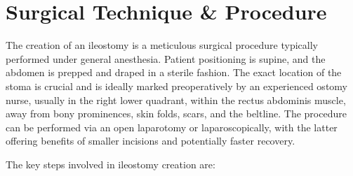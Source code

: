 \section*{Surgical Technique \& Procedure}
The creation of an ileostomy is a meticulous surgical procedure typically performed under general anesthesia. Patient positioning is supine, and the abdomen is prepped and draped in a sterile fashion. The exact location of the stoma is crucial and is ideally marked preoperatively by an experienced ostomy nurse, usually in the right lower quadrant, within the rectus abdominis muscle, away from bony prominences, skin folds, scars, and the beltline. The procedure can be performed via an open laparotomy or laparoscopically, with the latter offering benefits of smaller incisions and potentially faster recovery.

The key steps involved in ileostomy creation are:

